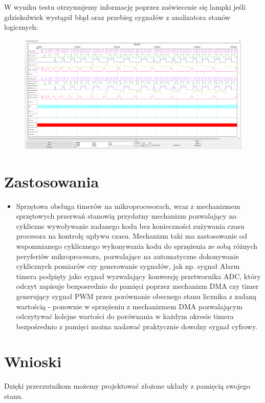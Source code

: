 \documentclass[a4paper]{article}
\begin{document}
\Large
W wyniku testu otrzymujemy informację poprzez zaświecenie się lampki jeśli gdziekolwiek wystąpił błąd oraz 
przebieg sygnałów z analizatora stanów logicznych:
\begin{figure}[H]
    \centering
    \includegraphics[width=\textwidth]{general_test_logic_analyzer.png}
\end{figure}
\pagebreak
\section{Zastosowania}
\begin{itemize}
    \item Sprzętowa obsługa timerów na mikroprocesorach, wraz z mechanizmem sprzętowych przerwań stanowią przydatny mechanizm
            pozwalający na cykliczne wywoływanie zadanego kodu bez konieczności zużywania czasu procesora na kontrolę upływu 
            czasu. Mechanizm taki ma zastosowanie od wspomnianego cyklicznego wykonywania kodu do sprzężenia ze sobą różnych peryferiów
            mikroprocesora, pozwalające na automatyczne dokonywanie cyklicznych pomiarów czy generowanie sygnałów, jak np. 
            sygnał Alarm timera podpięty jako sygnał wyzwalający konwersję przetwornika ADC, który odczyt zapisuje bezposrednio do pamięci
            poprzez mechanizm DMA czy timer generujący sygnał PWM przez porównanie obecnego stanu licznika z zadaną wartością - ponownie
            w sprzężeniu z mechanizmem DMA pozwalającym odczytywać kolejne wartości do porównania w każdym okresie timera bezpośrednio z pamięci
            można nadawać praktycznie dowolny sygnał cyfrowy.  %
\end{itemize}
\section{Wnioski}
Dzięki przerzutnikom możemy projektować złożone układy z pamięcią swojego stanu. 
\end{document}
